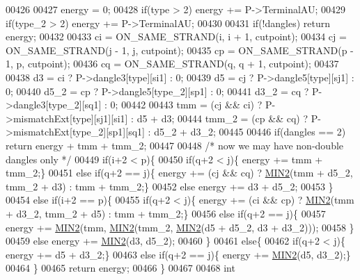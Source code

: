 \begin{DoxyCode}
00426 
00427   energy = 0;
00428   \textcolor{keywordflow}{if}(type > 2)   energy += P->TerminalAU;
00429   \textcolor{keywordflow}{if}(type\_2 > 2) energy += P->TerminalAU;
00430 
00431   \textcolor{keywordflow}{if}(!dangles) \textcolor{keywordflow}{return} energy;
00432 
00433   ci = ON\_SAME\_STRAND(i, i + 1, cutpoint);
00434   cj = ON\_SAME\_STRAND(j - 1, j, cutpoint);
00435   cp = ON\_SAME\_STRAND(p - 1, p, cutpoint);
00436   cq = ON\_SAME\_STRAND(q, q + 1, cutpoint);
00437 
00438   d3    = ci  ? P->dangle3[type][si1]   : 0;
00439   d5    = cj  ? P->dangle5[type][sj1]   : 0;
00440   d5\_2  = cp  ? P->dangle5[type\_2][sp1] : 0;
00441   d3\_2  = cq  ? P->dangle3[type\_2][sq1] : 0;
00442 
00443   tmm   = (cj && ci) ? P->mismatchExt[type][sj1][si1]   : d5 + d3;
00444   tmm\_2 = (cp && cq) ? P->mismatchExt[type\_2][sp1][sq1] : d5\_2 + d3\_2;
00445 
00446   \textcolor{keywordflow}{if}(dangles == 2) \textcolor{keywordflow}{return} energy + tmm + tmm\_2;
00447 
00448   \textcolor{comment}{/* now we may have non-double dangles only */}
00449   \textcolor{keywordflow}{if}(i+2 < p)\{
00450     \textcolor{keywordflow}{if}(q+2 < j)\{ energy += tmm + tmm\_2;\}
00451     \textcolor{keywordflow}{else} \textcolor{keywordflow}{if}(q+2 == j)\{ energy += (cj && cq) ? \hyperlink{group__utils_gae0b9cd0ce090bd69b951aa73e8fa4f7d}{MIN2}(tmm + d5\_2, tmm\_2 + d3) : tmm + tmm\_2;\}
00452     \textcolor{keywordflow}{else} energy += d3 + d5\_2;
00453   \}
00454   \textcolor{keywordflow}{else} \textcolor{keywordflow}{if}(i+2 == p)\{
00455     \textcolor{keywordflow}{if}(q+2 < j)\{ energy += (ci && cp) ? \hyperlink{group__utils_gae0b9cd0ce090bd69b951aa73e8fa4f7d}{MIN2}(tmm + d3\_2, tmm\_2 + d5) : tmm + tmm\_2;\}
00456     \textcolor{keywordflow}{else} \textcolor{keywordflow}{if}(q+2 == j)\{
00457       energy += \hyperlink{group__utils_gae0b9cd0ce090bd69b951aa73e8fa4f7d}{MIN2}(tmm, \hyperlink{group__utils_gae0b9cd0ce090bd69b951aa73e8fa4f7d}{MIN2}(tmm\_2, \hyperlink{group__utils_gae0b9cd0ce090bd69b951aa73e8fa4f7d}{MIN2}(d5 + d5\_2, d3 + d3\_2)));
00458     \}
00459     \textcolor{keywordflow}{else} energy += \hyperlink{group__utils_gae0b9cd0ce090bd69b951aa73e8fa4f7d}{MIN2}(d3, d5\_2);
00460   \}
00461   \textcolor{keywordflow}{else}\{
00462     \textcolor{keywordflow}{if}(q+2 < j)\{ energy += d5 + d3\_2;\}
00463     \textcolor{keywordflow}{else} \textcolor{keywordflow}{if}(q+2 == j)\{ energy += \hyperlink{group__utils_gae0b9cd0ce090bd69b951aa73e8fa4f7d}{MIN2}(d5, d3\_2);\}
00464   \}
00465   \textcolor{keywordflow}{return} energy;
00466 \}
00467 
00468 \textcolor{keywordtype}{int}

\end{DoxyCode}
